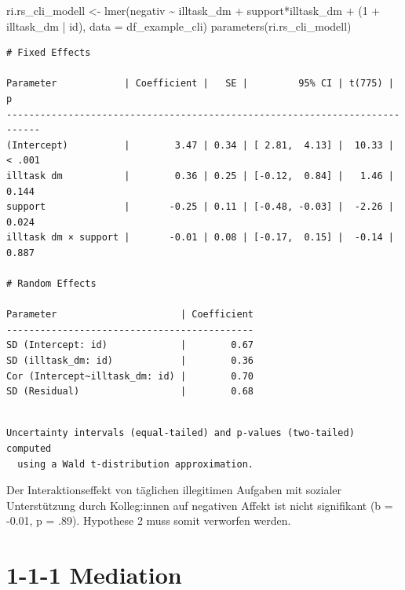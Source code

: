 \documentclass[
  letterpaper,
  DIV=11,
  numbers=noendperiod]{scrreprt}
\newenvironment{Shaded}{\begin{snugshade}}{\end{snugshade}}
\newcommand{\AttributeTok}[1]{\textcolor[rgb]{0.40,0.45,0.13}{#1}}
\newcommand{\DecValTok}[1]{\textcolor[rgb]{0.68,0.00,0.00}{#1}}
\newcommand{\FunctionTok}[1]{\textcolor[rgb]{0.28,0.35,0.67}{#1}}
\newcommand{\NormalTok}[1]{\textcolor[rgb]{0.00,0.23,0.31}{#1}}
\newcommand{\OtherTok}[1]{\textcolor[rgb]{0.00,0.23,0.31}{#1}}
\newcommand{\SpecialCharTok}[1]{\textcolor[rgb]{0.37,0.37,0.37}{#1}}
\begin{document}
\begin{tcolorbox}
\begin{Shaded}
\begin{Highlighting}[]
\NormalTok{ri.rs\_cli\_modell }\OtherTok{\textless{}{-}} \FunctionTok{lmer}\NormalTok{(negativ }\SpecialCharTok{\textasciitilde{}}\NormalTok{ illtask\_dm  }\SpecialCharTok{+}\NormalTok{ support}\SpecialCharTok{*}\NormalTok{illtask\_dm }\SpecialCharTok{+}\NormalTok{ (}\DecValTok{1} \SpecialCharTok{+}\NormalTok{ illtask\_dm }\SpecialCharTok{|}\NormalTok{ id), }\AttributeTok{data =}\NormalTok{ df\_example\_cli)}
\FunctionTok{parameters}\NormalTok{(ri.rs\_cli\_modell)}
\end{Highlighting}
\end{Shaded}

\begin{verbatim}
# Fixed Effects

Parameter            | Coefficient |   SE |         95% CI | t(775) |      p
----------------------------------------------------------------------------
(Intercept)          |        3.47 | 0.34 | [ 2.81,  4.13] |  10.33 | < .001
illtask dm           |        0.36 | 0.25 | [-0.12,  0.84] |   1.46 | 0.144 
support              |       -0.25 | 0.11 | [-0.48, -0.03] |  -2.26 | 0.024 
illtask dm × support |       -0.01 | 0.08 | [-0.17,  0.15] |  -0.14 | 0.887 

# Random Effects

Parameter                      | Coefficient
--------------------------------------------
SD (Intercept: id)             |        0.67
SD (illtask_dm: id)            |        0.36
Cor (Intercept~illtask_dm: id) |        0.70
SD (Residual)                  |        0.68
\end{verbatim}

\begin{verbatim}

Uncertainty intervals (equal-tailed) and p-values (two-tailed) computed
  using a Wald t-distribution approximation.
\end{verbatim}

Der Interaktionseffekt von täglichen illegitimen Aufgaben mit sozialer
Unterstützung durch Kolleg:innen auf negativen Affekt ist nicht
signifikant (b = -0.01, p = .89). Hypothese 2 muss somit verworfen
werden.

\end{tcolorbox}

\section{1-1-1 Mediation}\label{mediation}
\end{document}
